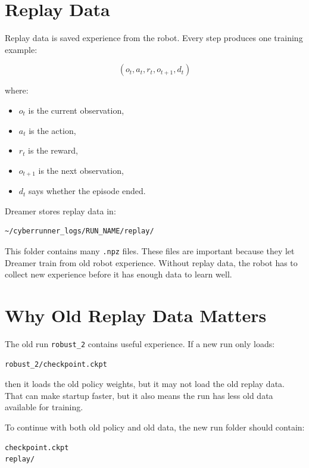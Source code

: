 \documentclass[11pt]{article}
\begin{document}
\section{Replay Data}

Replay data is saved experience from the robot. Every step produces one training example:

\begin{equation}
(o_t, a_t, r_t, o_{t+1}, d_t)
\end{equation}

where:

\begin{itemize}[leftmargin=*]
  \item $o_t$ is the current observation,
  \item $a_t$ is the action,
  \item $r_t$ is the reward,
  \item $o_{t+1}$ is the next observation,
  \item $d_t$ says whether the episode ended.
\end{itemize}

Dreamer stores replay data in:

\begin{lstlisting}
~/cyberrunner_logs/RUN_NAME/replay/
\end{lstlisting}

This folder contains many \texttt{.npz} files. These files are important because they let Dreamer train from old robot experience. Without replay data, the robot has to collect new experience before it has enough data to learn well.

\section{Why Old Replay Data Matters}

The old run \texttt{robust\_2} contains useful experience. If a new run only loads:

\begin{lstlisting}
robust_2/checkpoint.ckpt
\end{lstlisting}

then it loads the old policy weights, but it may not load the old replay data. That can make startup faster, but it also means the run has less old data available for training.

To continue with both old policy and old data, the new run folder should contain:

\begin{lstlisting}
checkpoint.ckpt
replay/
\end{lstlisting}
\end{document}
